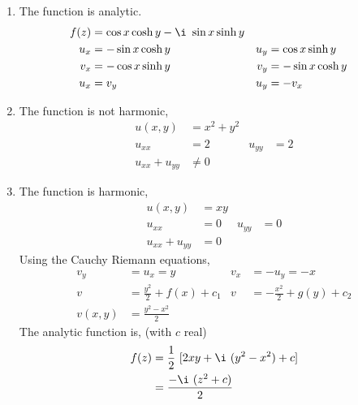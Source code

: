 \begin{enumerate}
    \item The function is \textcolor{y_h}{analytic}.
          \begin{align}
              f(z) & = \cos x \cosh y - \i\ \sin x \sinh y   \\
              u_x  & = -\sin x \cosh y                     &
              u_y  & = \cos x \sinh y                        \\
              v_x  & = -\cos x \sinh y                     &
              v_y  & = - \sin x \cosh y                      \\
              u_x  & = v_y                                 &
              u_y  & = -v_x
          \end{align}

    \item The function is \textcolor{y_p}{not harmonic},
          \begin{align}
              u(x, y)         & = x^2 + y^2   \\
              u_{xx}          & = 2         &
              u_{yy}          & = 2           \\
              u_{xx} + u_{yy} & \neq 0
          \end{align}

    \item The function is \textcolor{y_h}{harmonic},
          \begin{align}
              u(x, y)         & = xy   \\
              u_{xx}          & = 0  &
              u_{yy}          & = 0    \\
              u_{xx} + u_{yy} & = 0
          \end{align}
          Using the Cauchy Riemann equations,
          \begin{align}
              v_y     & = u_x = y                     &
              v_x     & = -u_y = -x                     \\
              v       & = \frac{y^2}{2} + f(x) + c_1  &
              v       & = -\frac{x^2}{2} + g(y) + c_2   \\
              v(x, y) & = \frac{y^2 - x^2}{2}
          \end{align}
          The analytic function is, (with $ c $ real)
          \begin{align}
              f(z) & = \frac{1}{2}\ [2xy + \i\ (y^2 - x^2) + c] \\
                   & = \frac{-\i\ (z^2 + c)}{2}
          \end{align}


\end{enumerate}
